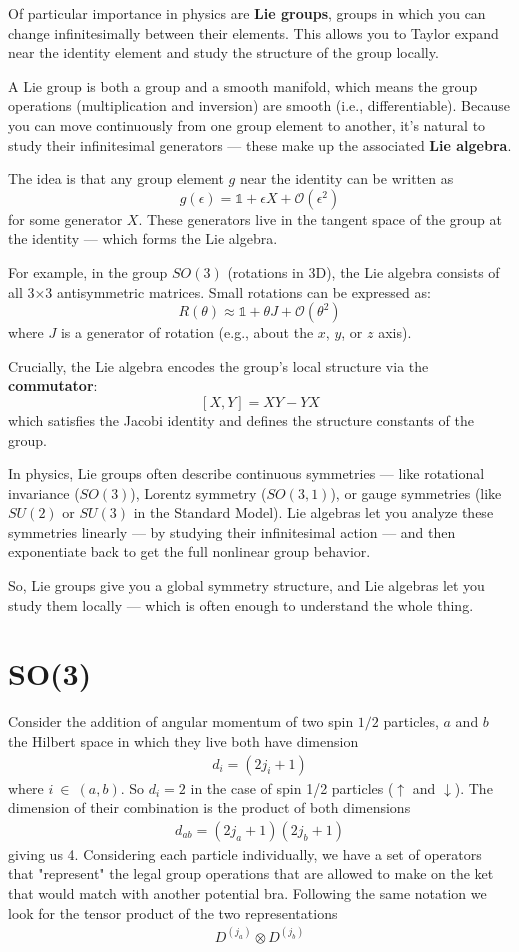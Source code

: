 Of particular importance in physics are \textbf{Lie groups}, groups in which you can change infinitesimally between their elements. This allows you to Taylor expand near the identity element and study the structure of the group locally.

A Lie group is both a group and a smooth manifold, which means the group operations (multiplication and inversion) are smooth (i.e., differentiable). Because you can move continuously from one group element to another, it's natural to study their infinitesimal generators — these make up the associated \textbf{Lie algebra}.

The idea is that any group element $g$ near the identity can be written as
\[
g(\epsilon) = \mathbb{1} + \epsilon X + \mathcal{O}(\epsilon^2)
\]
for some generator $X$. These generators live in the tangent space of the group at the identity — which forms the Lie algebra.

For example, in the group $SO(3)$ (rotations in 3D), the Lie algebra consists of all 3×3 antisymmetric matrices. Small rotations can be expressed as:
\[
R(\theta) \approx \mathbb{1} + \theta J + \mathcal{O}(\theta^2)
\]
where $J$ is a generator of rotation (e.g., about the $x$, $y$, or $z$ axis).

Crucially, the Lie algebra encodes the group's local structure via the \textbf{commutator}:
\[
[X, Y] = XY - YX
\]
which satisfies the Jacobi identity and defines the structure constants of the group.

In physics, Lie groups often describe continuous symmetries — like rotational invariance ($SO(3)$), Lorentz symmetry ($SO(3,1)$), or gauge symmetries (like $SU(2)$ or $SU(3)$ in the Standard Model). Lie algebras let you analyze these symmetries linearly — by studying their infinitesimal action — and then exponentiate back to get the full nonlinear group behavior.

So, Lie groups give you a global symmetry structure, and Lie algebras let you study them locally — which is often enough to understand the whole thing.
\section{SO(3)}
Consider the addition of angular momentum of two spin $1/2$ particles, $a$ and $b$ the Hilbert space in which they live both have dimension
\begin{align}
d_i = (2j_i + 1)
\end{align}
where $i ~\in~(a,b)$. So $d_i = 2$ in the case of spin 1/2 particles ($\uparrow$ and $\downarrow$). The dimension of their combination is the product of both dimensions
\begin{align}
d_{ab} = (2j_a+1)(2j_b+1)
\end{align}
giving us 4. Considering each particle individually, we have a set of operators that "represent" the legal group operations that are allowed to make on the ket that would match with another potential bra. Following the same notation we look for the tensor product of the two representations
\begin{align}
D^{(j_a)}\otimes D^{(j_b)}
\end{align}

